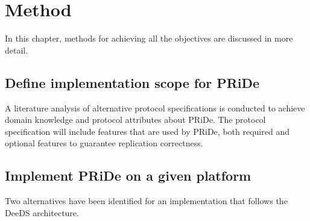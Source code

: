 \section{Method} %
\label{sec:method}

In this chapter, methods for achieving all the objectives are discussed in more detail.

\subsection{Define implementation scope for PRiDe} 
\label{subsec:impl_bound}

A literature analysis of alternative protocol specifications is conducted to achieve domain knowledge and protocol attributes about PRiDe. The protocol specification will include features that are used by PRiDe, both required and optional features to guarantee replication correctness. 

\subsection{Implement PRiDe on a given platform} 
\label{subsec:create_implementation}

Two alternatives have been identified for an implementation that follows the DeeDS architecture.

